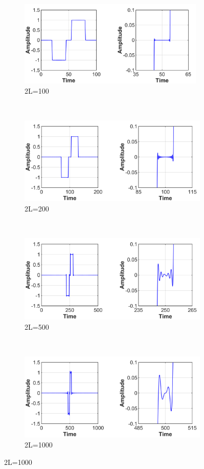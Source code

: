\begin{figure}
    \centering
    \begin{subfigure}[t]{\textwidth}
        \centering
        \includegraphics[height=4.1cm,trim={0 0 0 6mm},clip]
        	{Simulations/TimeDep/var_period_P100}
        \caption{2L=100}
        \label{fig:period_100}
    \end{subfigure}\\%
	\vspace{1ex}%
    \begin{subfigure}[t]{\textwidth}
        \centering
        \includegraphics[height=4.2cm]{Simulations/TimeDep/var_period_P200}
        \caption{2L=200}
        \label{fig:period_200}
    \end{subfigure}\\%
	\vspace{1ex}%
    \begin{subfigure}[t]{\textwidth}
        \centering
        \includegraphics[height=4.2cm]{Simulations/TimeDep/var_period_P500}
        \caption{2L=500}
        \label{fig:period_500}
    \end{subfigure}\\%
	\vspace{1ex}%
    \begin{subfigure}[t]{\textwidth}
        \centering
        \includegraphics[height=4.2cm]{Simulations/TimeDep/var_period_P1000}
        \caption{2L=1000}
        \label{fig:period_1000}
    \end{subfigure}%
    

\end{figure}
